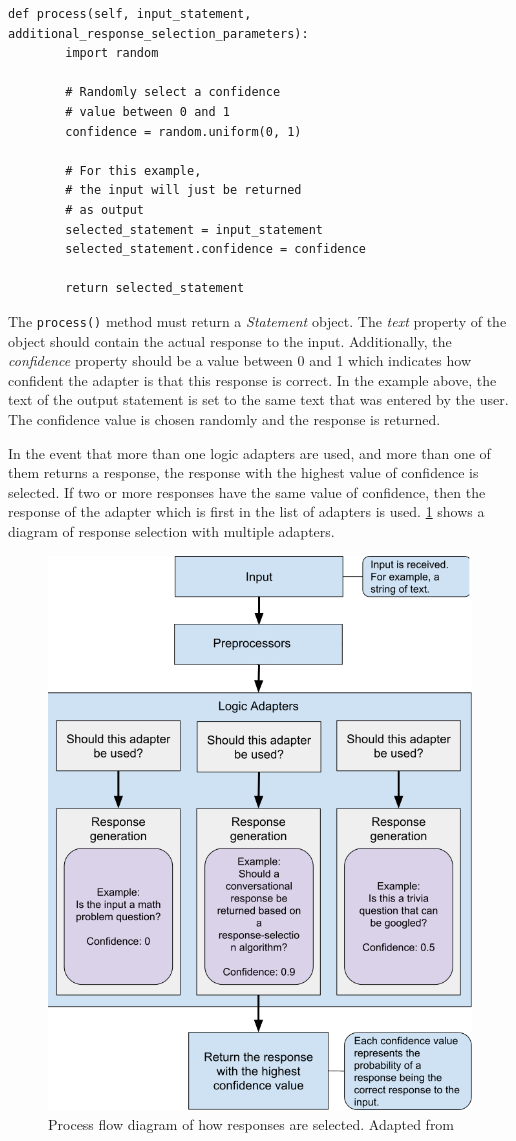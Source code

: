 \documentclass[12pt,a4paper]{article}
\newcommand{\captionstyle}[1] {
    \small{#1}
}
\begin{document}
\begin{lstlisting}[caption={\small{\textit{Example implementation of the process() method. Adapted from \cite{Chatterbot:online}}}}, label={lst:process}]
    def process(self, input_statement, additional_response_selection_parameters):
        import random

        # Randomly select a confidence
        # value between 0 and 1
        confidence = random.uniform(0, 1)

        # For this example,
        # the input will just be returned
        # as output
        selected_statement = input_statement
        selected_statement.confidence = confidence

        return selected_statement
\end{lstlisting}

The \texttt{process()} method must return a \textit{Statement} object. The \textit{text} property of the object should contain the actual response to the input. Additionally, the \textit{confidence} property should be a value between 0 and 1 which indicates how confident the adapter is that this response is correct. In the example above, the text of the output statement is set to the same text that was entered by the user. The confidence value is chosen randomly and the response is returned.

In the event that more than one logic adapters are used, and more than one of them returns a response, the response with the highest value of confidence is selected. If two or more responses have the same value of confidence, then the response of the adapter which is first in the list of adapters is used. \cref{fig:dialog-processing-flow} shows a diagram of response selection with multiple adapters.

\begin{figure}[!htb]%
    \centering
    \includegraphics[width=0.7\columnwidth]{dialog-processing-flow}%
    \caption{\captionstyle{Process flow diagram of how responses are selected. Adapted from \cite{Chatterbot:online}}}%
    \label{fig:dialog-processing-flow}%
\end{figure}
\end{document}

